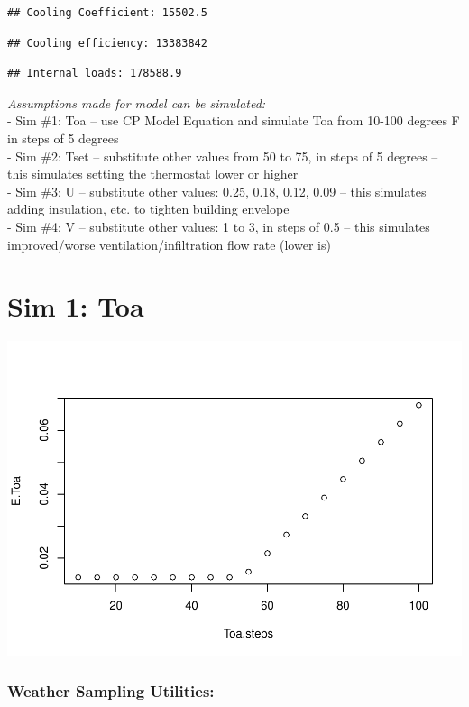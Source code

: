 \documentclass[]{article}
\begin{document}
\begin{verbatim}
## Cooling Coefficient: 15502.5
\end{verbatim}

\begin{verbatim}
## Cooling efficiency: 13383842
\end{verbatim}

\begin{verbatim}
## Internal loads: 178588.9
\end{verbatim}

\emph{Assumptions made for model can be simulated:}\\
- Sim \#1: Toa -- use CP Model Equation and simulate Toa from 10-100
degrees F in steps of 5 degrees\\
- Sim \#2: Tset -- substitute other values from 50 to 75, in steps of 5
degrees -- this simulates setting the thermostat lower or higher\\
- Sim \#3: U -- substitute other values: 0.25, 0.18, 0.12, 0.09 -- this
simulates adding insulation, etc. to tighten building envelope\\
- Sim \#4: V -- substitute other values: 1 to 3, in steps of 0.5 -- this
simulates improved/worse ventilation/infiltration flow rate (lower is)

\section{Sim 1: Toa}\label{sim-1-toa}

\includegraphics{Paper-BuildingEnergySim_files/figure-latex/unnamed-chunk-9-1.pdf}

\subsubsection{Weather Sampling
Utilities:}\label{weather-sampling-utilities}
\end{document}
